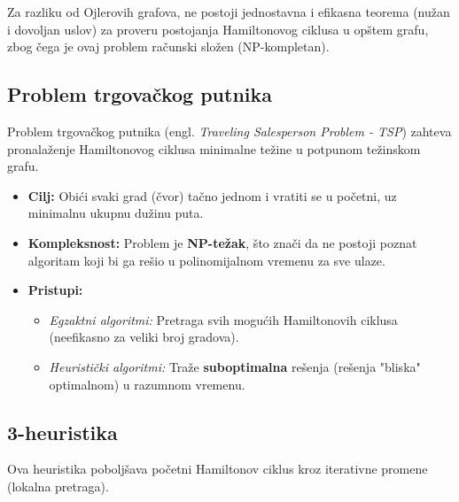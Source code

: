 \documentclass[a4paper,12pt]{article}
\numberwithin{algorithm}{section}
\theoremstyle{plain}
\theoremstyle{definition}
\theoremstyle{remark}
\begin{document}
Za razliku od Ojlerovih grafova, ne postoji jednostavna i efikasna teorema (nužan i dovoljan uslov) za proveru postojanja Hamiltonovog ciklusa u opštem grafu, zbog čega je ovaj problem računski složen (NP-kompletan).

\subsection{Problem trgovačkog putnika}
Problem trgovačkog putnika (engl. \textit{Traveling Salesperson Problem - TSP}) zahteva pronalaženje Hamiltonovog ciklusa minimalne težine u potpunom težinskom grafu.

\begin{itemize}
    \item \textbf{Cilj:} Obići svaki grad (čvor) tačno jednom i vratiti se u početni, uz minimalnu ukupnu dužinu puta.
    \item \textbf{Kompleksnost:} Problem je \textbf{NP-težak}, što znači da ne postoji poznat algoritam koji bi ga rešio u polinomijalnom vremenu za sve ulaze.
    \item \textbf{Pristupi:}
    \begin{itemize}
        \item \textit{Egzaktni algoritmi:} Pretraga svih mogućih Hamiltonovih ciklusa (neefikasno za veliki broj gradova).
        \item \textit{Heuristički algoritmi:} Traže \textbf{suboptimalna} rešenja (rešenja "bliska" optimalnom) u razumnom vremenu.
    \end{itemize}
\end{itemize}

\newpage

\subsection{3-heuristika}
Ova heuristika poboljšava početni Hamiltonov ciklus kroz iterativne promene (lokalna pretraga).
\end{document}
